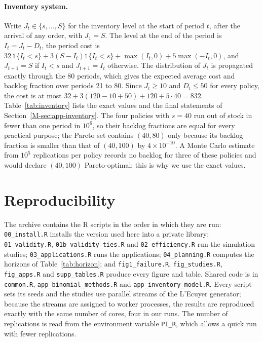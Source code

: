 \paragraph{Inventory system.} Write $J_t\in\{s,\dots,S\}$ for the inventory level at the start of period $t$, after the arrival of any order, with $J_1=S$. The level at the end of the period is $I_t=J_t-D_t$, the period cost is $32\,\mathbb{1}\{I_t<s\}+3(S-I_t)\mathbb{1}\{I_t<s\}+\max(I_t,0)+5\max(-I_t,0)$, and $J_{t+1}=S$ if $I_t<s$ and $J_{t+1}=I_t$ otherwise. The distribution of $J_t$ is propagated exactly through the 80 periods, which gives the expected average cost and backlog fraction over periods 21 to 80. Since $J_t\ge 10$ and $D_t\le 50$ for every policy, the cost is at most $32+3(120-10+50)+120+5\cdot40=832$. Table~\ref{tab:inventory} lists the exact values and the final statements of Section~\ref{M-sec:app-inventory}. The four policies with $s=40$ run out of stock in fewer than one period in $10^6$, so their backlog fractions are equal for every practical purpose; the Pareto set contains $(40,80)$ only because its backlog fraction is smaller than that of $(40,100)$ by $4\times10^{-10}$. A Monte Carlo estimate from $10^5$ replications per policy records no backlog for three of these policies and would declare $(40,100)$ Pareto-optimal; this is why we use the exact values.

\begin{table}[ht]
\centering
\caption{$(s,S)$ inventory policies: exact average cost per period and backlog fraction, membership of the Pareto set, number of evaluations and final statements after $10^5$ evaluations.}
\label{tab:inventory}
\footnotesize

\end{table}


\section{Reproducibility}\label{sec:repro}

The archive contains the R scripts in the order in which they are run: \texttt{00\_install.R} installs the  version used here into a private library; \texttt{01\_validity.R}, \texttt{01b\_validity\_ties.R} and \texttt{02\_efficiency.R} run the simulation studies; \texttt{03\_applications.R} runs the applications; \texttt{04\_planning.R} computes the horizons of Table~\ref{tab:horizon}; and \texttt{fig1\_failure.R}, \texttt{fig\_studies.R}, \texttt{fig\_apps.R} and \texttt{supp\_tables.R} produce every figure and table. Shared code is in \texttt{common.R}, \texttt{app\_binomial\_methods.R} and \texttt{app\_inventory\_model.R}. Every script sets its seeds and the studies use parallel streams of the L'Ecuyer generator; because the streams are assigned to worker processes, the results are reproduced exactly with the same number of cores, four in our runs. The number of replications is read from the environment variable \texttt{PI\_R}, which allows a quick run with fewer replications.
